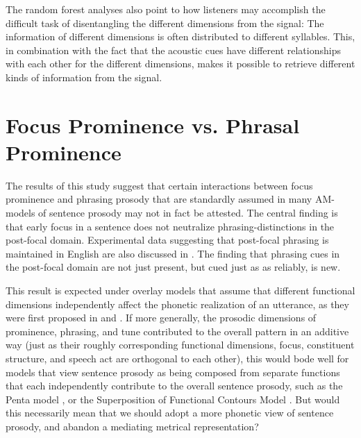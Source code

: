 \documentclass[preprint,review,12pt,authoryear,times]{elsarticle}
\begin{document}
The random forest analyses also point to how listeners may accomplish the difficult task of disentangling the different dimensions from the signal: The information of different dimensions is often distributed to different syllables. This, in combination with the fact that the acoustic cues have different relationships with each other for the different dimensions, makes it possible to retrieve different kinds of information from the signal. 


\section{Focus Prominence vs. Phrasal Prominence}

The results of this study suggest that certain interactions between focus prominence and phrasing prosody that are standardly assumed in many AM-models of sentence prosody may not in fact be attested. The central finding is that early focus in a sentence does not neutralize phrasing-distinctions in the post-focal domain. Experimental data suggesting that post-focal phrasing is maintained in English are also discussed in \citet{norcl05} \citep[and][for other languages]{jun00, sugah03, ishih03, ishih16, kugle17}.  The finding that phrasing cues in the post-focal domain are not just present, but cued just as as reliably, is new.  

This result is expected under overlay models that assume that different functional dimensions independently affect the phonetic realization of an utterance, as they were first proposed in \citet{ohman67} and  \citet{fujis81}. If more generally, the prosodic dimensions of prominence, phrasing, and tune contributed to the overall pattern in an additive way (just as their roughly corresponding functional dimensions, focus, constituent structure, and speech act are orthogonal to each other),  this would bode well for models that view sentence prosody as being composed from separate functions that each independently contribute to the overall sentence prosody, such as the Penta model  \citep{xu05}, or the Superposition of Functional Contours Model \citep{baill05,geraz18}. But would this necessarily mean that we should adopt a more phonetic view of sentence prosody, and abandon a mediating metrical representation? 
\end{document}
